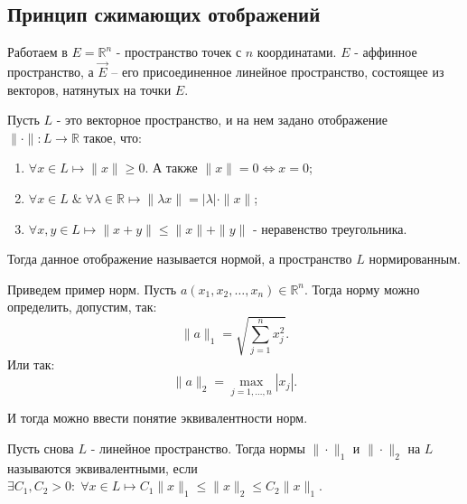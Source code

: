 



	\subsection*{Принцип сжимающих отображений}
	
	Работаем в $E =\mathbb{R}^n$ - пространство точек с $n$ координатами. $E$ - аффинное пространство, а $\vec{E}$ -- его присоединенное линейное пространство, состоящее из векторов, натянутых на точки $E$.
	
	\begin{definition}
		Пусть $L$ - это векторное пространство, и на нем задано отображение $\|\cdot\|:L\longrightarrow \mathbb{R}$ такое, что:
		\begin{enumerate}
			\item $\forall x \in L \longmapsto \|x\| \geqslant 0$. А также $\|x\| = 0 \Longleftrightarrow x = 0$;
			
			\item $\forall x \in L \; \& \; \forall \lambda \in \mathbb{R} \longmapsto \|\lambda x\| = |\lambda| \cdot \|x\|$;
			
			\item $\forall x, y \in L \longmapsto \|x+y\| \leqslant \|x\| + \|y\|$ - неравенство треугольника.
		\end{enumerate}
		Тогда данное отображение называется нормой, а пространство $L$ нормированным.
	\end{definition}

	\begin{example}
		Приведем пример норм. Пусть $a(x_1, x_2, \dots, x_n) \in \mathbb{R}^n$. Тогда норму можно определить, допустим, так:
		\begin{equation*}
			\|a\|_1 = \sqrt{\sum_{j = 1}^{n} x_j^2}.
		\end{equation*}
	Или так:
		\begin{equation*}
			\|a\|_2 = \max_{j = 1, \dots, n}|x_j|.
		\end{equation*}
	\end{example}

	И тогда можно ввести понятие эквивалентности норм.
	
	\begin{definition}
		Пусть снова $L$ - линейное пространство. Тогда нормы $\| \cdot \|_1$ и $\| \cdot \|_2$ на $L$ называются эквивалентными, если $\exists C_1, C_2 > 0: \; \forall x \in L \longmapsto C_1\|x\|_1 \leqslant \|x\|_2 \leqslant C_2\|x\|_1$.
	\end{definition}

